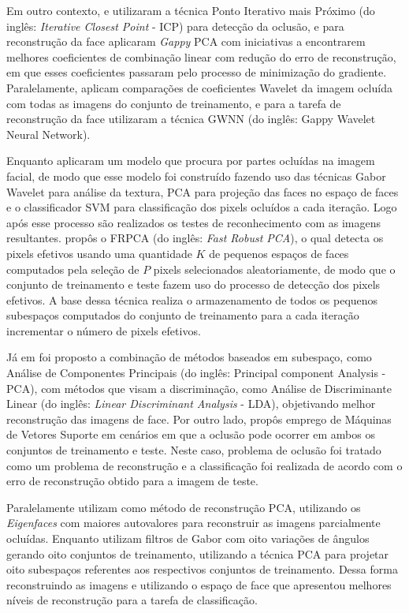 Em outro contexto,  e  utilizaram a técnica Ponto Iterativo mais Próximo (do inglês: \textit{Iterative Closest Point} - ICP)  para detecção da oclusão, e para reconstrução da face aplicaram \textit{Gappy} PCA com iniciativas a encontrarem melhores coeficientes de combinação linear com redução do erro de reconstrução, em que esses coeficientes passaram pelo processo de minimização do gradiente. Paralelamente,  aplicam comparações de coeficientes Wavelet da imagem ocluída com todas as imagens do conjunto de treinamento, e para a tarefa de reconstrução da face utilizaram a técnica GWNN (do inglês: Gappy Wavelet Neural Network). 

Enquanto  aplicaram um modelo que procura por partes ocluídas na imagem facial, de modo que esse modelo foi construído fazendo uso das técnicas Gabor Wavelet para análise da textura, PCA para projeção das faces no espaço de faces e o classificador SVM para classificação dos pixels ocluídos a cada iteração. Logo após esse processo são realizados os testes de reconhecimento com as imagens resultantes.  propôs o FRPCA (do inglês: \textit{Fast Robust PCA}), o qual detecta os pixels efetivos usando uma quantidade $K$ de pequenos espaços de faces computados pela seleção de $P$ pixels selecionados aleatoriamente, de modo que o conjunto de treinamento e teste fazem uso do processo de detecção dos pixels efetivos. A base dessa técnica realiza o armazenamento de todos os pequenos subespaços computados do conjunto de  treinamento para a cada iteração incrementar o número de pixels efetivos.


Já em   foi proposto a combinação de métodos baseados em subespaço, como Análise de Componentes Principais (do inglês: Principal component Analysis - PCA), com métodos que visam a discriminação, como Análise de Discriminante Linear (do inglês: \textit{Linear Discriminant Analysis} - LDA), objetivando melhor reconstrução das imagens de face.  Por outro lado,  propôs emprego de Máquinas de Vetores Suporte  em cenários em que a oclusão pode ocorrer em ambos os conjuntos de treinamento e teste. Neste caso, problema de oclusão foi tratado como um problema de reconstrução e a classificação foi realizada de acordo com o erro de reconstrução obtido para a imagem de teste. 


Paralelamente  utilizam como método de reconstrução PCA, utilizando os \textit{Eigenfaces} com maiores autovalores para reconstruir as imagens parcialmente ocluídas. Enquanto  utilizam filtros de Gabor com oito variações de ângulos gerando oito conjuntos de treinamento, utilizando a técnica PCA para projetar oito subespaços referentes aos respectivos conjuntos de treinamento. Dessa forma reconstruindo as imagens e utilizando o espaço de face que apresentou melhores níveis de reconstrução para a tarefa de classificação.



